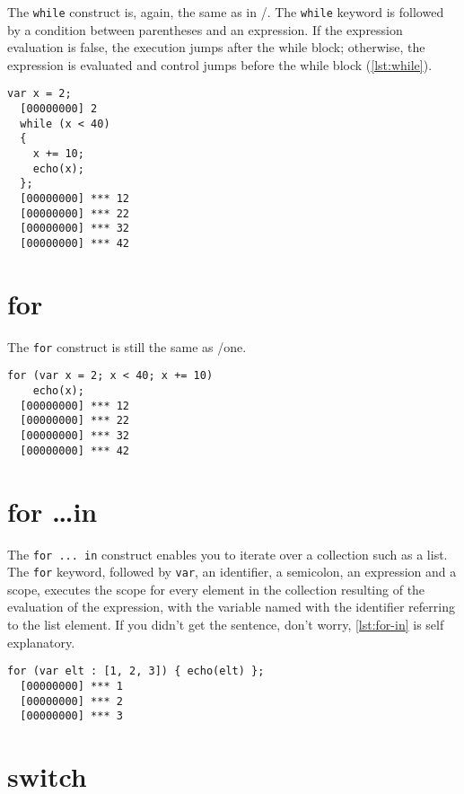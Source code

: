 \documentclass[openright,twoside,12pt]{report}
\begin{document}
The \texttt{while} construct is, again, the same as in \C/\Cxx. The
\texttt{while} keyword is followed by a condition between parentheses
and an expression. If the expression evaluation is false, the
execution jumps after the while block; otherwise, the expression is
evaluated and control jumps before the while block (\autoref{lst:while}).

\begin{lstlisting}[caption=The \texttt{while} construct,
  label=lst:while]
  var x = 2;
  [00000000] 2
  while (x < 40)
  {
    x += 10;
    echo(x);
  };
  [00000000] *** 12
  [00000000] *** 22
  [00000000] *** 32
  [00000000] *** 42
\end{lstlisting}

\section{for}

The \texttt{for} construct is still the same as \C/\Cxx one.

\begin{lstlisting}[caption=Nihil novi sub sole, label=lst:for]
  for (var x = 2; x < 40; x += 10)
    echo(x);
  [00000000] *** 12
  [00000000] *** 22
  [00000000] *** 32
  [00000000] *** 42
\end{lstlisting}

\section{for \ldots in}

The \texttt{for ... in} construct enables you to iterate over a
collection such as a list. The \texttt{for} keyword, followed by
\lstinline|var|, an identifier, a semicolon, an expression and a
scope, executes the scope for every element in the collection
resulting of the evaluation of the expression, with the variable named
with the identifier referring to the list element. If you didn't get
the sentence, don't worry, \autoref{lst:for-in} is self explanatory.

\begin{lstlisting}[caption=Collection iteration with \texttt{for},
  label=lst:for-in]
  for (var elt : [1, 2, 3]) { echo(elt) };
  [00000000] *** 1
  [00000000] *** 2
  [00000000] *** 3
\end{lstlisting}

\section{switch}
\end{document}
